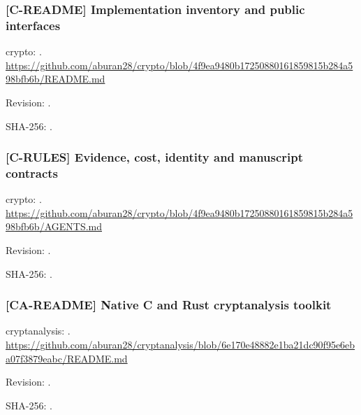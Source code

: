 \par\noindent\begin{minipage}{\linewidth}\small
\subsubsection*{[C-README] Implementation inventory and public interfaces}\label{art:C-README}
crypto: .
\url{https://github.com/aburan28/crypto/blob/4f9ea9480b17250880161859815b284a598bfb6b/README.md}
\par Revision: .
\par SHA-256: .
\end{minipage}\par\medskip

\par\noindent\begin{minipage}{\linewidth}\small
\subsubsection*{[C-RULES] Evidence, cost, identity and manuscript contracts}\label{art:C-RULES}
crypto: .
\url{https://github.com/aburan28/crypto/blob/4f9ea9480b17250880161859815b284a598bfb6b/AGENTS.md}
\par Revision: .
\par SHA-256: .
\end{minipage}\par\medskip

\par\noindent\begin{minipage}{\linewidth}\small
\subsubsection*{[CA-README] Native C and Rust cryptanalysis toolkit}\label{art:CA-README}
cryptanalysis: .
\url{https://github.com/aburan28/cryptanalysis/blob/6e170e48882e1ba21dc90f95e6eba07f3879eabc/README.md}
\par Revision: .
\par SHA-256: .
\end{minipage}\par\medskip

